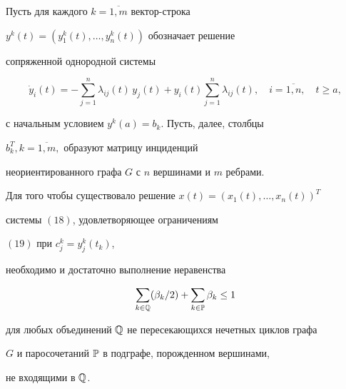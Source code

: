 \begin{thm}


Пусть для каждого $k=\overline{1,m}$ вектор-строка


$y^k(t)=(y_1^k(t),\dotsc,y_n^k(t))$ обозначает решение


сопряженной однородной системы


\begin{equation}


\Dot y_i(t)=-\sum_{j=1}^n\lambda_{ij}(t)\,y_j(t)+


y_i(t)\sum_{j=1}^n\lambda_{ij}(t),\quad i=\overline{1,n},


\quad t\ge a, %


\end{equation}


с начальным условием $y^k(a)=b_k$. Пусть, далее, столбцы


$b_k^T,k=\overline{1,m},$ образуют матрицу инциденций


неориентированного графа $G$ с $n$ вершинами и $m$ ребрами.





Для того чтобы существовало решение $x(t)=(x_1(t),\dotsc,x_n(t))^T$


системы $(18)$, удовлетворяющее ограничениям


$(19)$ при $c_j^k=y_j^k(t_k)$,


необходимо и достаточно выполнение неравенства


$$


\sum_{k\in \Bbb Q}(\beta_k/2)+\sum_{k\in \Bbb P}\beta_k \le 1


$$


для любых объединений $\Bbb Q$ не пересекающихся нечетных циклов графа


$G$ и паросочетаний $\Bbb P$ в подграфе, порожденном вершинами,


не входящими в $\Bbb Q$.


\end{thm}





